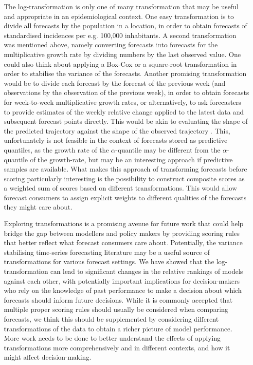 \documentclass{article}
\begin{document}
The log-transformation is only one of many transformation that may be useful and appropriate in an epidemiological context. One easy transformation is to divide all forecasts by the population in a location, in order to obtain forecasts of standardised incidences per e.g. 100,000 inhabitants. A second transformation was mentioned above, namely converting forecasts into forecasts for the multiplicative growth rate by dividing numbers by the last observed value. One could also think about applying a Box-Cox \citep{boxAnalysisTransformations1964} or a square-root transformation in order to stabilise the variance of the forecasts. Another promising transformation would be to divide each forecast by the forecast of the previous week (and observations by the observation of the previous week), in order to obtain forecasts for week-to-week multiplicative growth rates, or alternatively, to ask forecasters to provide estimates of the weekly relative change applied to the latest data and subsequent forecast points directly. This would be akin to evaluating the shape of the predicted trajectory against the shape of the observed trajectory \citep[for a different approach to evaluate the shape of a forecast, see][]{srivastavaShapebasedEvaluationEpidemic2022}. This, unfortunately is not feasible in the context of forecasts stored as predictive quantiles, as the growth rate of the $\alpha$-quantile may be different from the $\alpha$-quantile of the growth-rate, but may be an interesting approach if predictive samples are available. What makes this approach of transforming forecasts before scoring particularly interesting is the possibility to construct composite scores as a weighted sum of scores based on different transformations. This would allow forecast consumers to assign explicit weights to different qualities of the forecasts they might care about.

Exploring transformations is a promising avenue for future work that could help bridge the gap between modellers and policy makers by providing scoring rules that better reflect what forecast consumers care about. Potentially, the variance stabilising time-series forecasting literature may be a useful source of transformations for various forecast settings. We have showed that the log-transformation can lead to significant changes in the relative rankings of models against each other, with potentially important implications for decision-makers who rely on the knowledge of past performance to make a decision about which forecasts should inform future decisions. While it is commonly accepted that multiple proper scoring rules should usually be considered when comparing forecasts, we think this should be supplemented by considering different transformations of the data to obtain a richer picture of model performance. More work needs to be done to better understand the effects of applying transformations more comprehensively and in different contexts, and how it might affect decision-making. 
\end{document}
